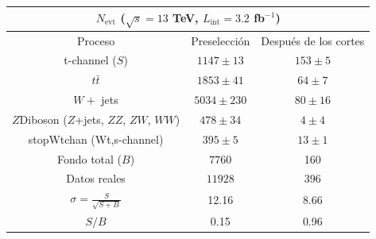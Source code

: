 \documentclass[10pt]{beamer}
\begin{document}
\begin{frame}
	\begin{table}
		\centering
		\begin{tabular}{|c|c|c|}
			\hline
			\multicolumn{3}{|c|}{$N_{\text{evt}}$ ($\sqrt{s}=13$ TeV, $L_{\text{int}}=3.2$ fb$^{-1}$)} \\\hline
			Proceso & Preselección & Después de los cortes \\
			\hline\hline
			t-channel ($S$) & $1147\pm 13$& $153\pm5$ \\\hline
			 $t\bar{t}$ & $1853\pm41$& $64\pm7$\\
			  $W+$ jets &$5034\pm230$ & $80\pm 16$ \\
			   $Z$Diboson ($Z$+jets, $ZZ$, $ZW$, $WW$) & $478\pm 34$  & $4\pm 4$\\
			   	  stopWtchan (Wt,s-channel) & $395\pm5$ & $13\pm 1$\\\hline
			   	  	  Fondo total ($B$) &$7760$ & 160\\ \hline\hline
			   	  	  Datos reales &$11928$ & 396\\ \hline\hline
			   	  	  	  $\sigma=\tfrac{S}{\sqrt{S+B}}$ & 12.16 & 8.66 \\ \hline
			   	  	  	  	  $S/B$ & 0.15& 0.96\\
			    \hline
		\end{tabular}
	\end{table}
\end{frame}
\end{document}
